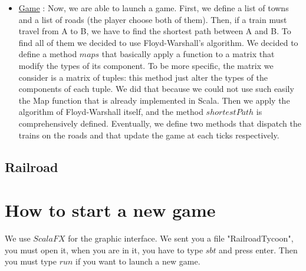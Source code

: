 \documentclass[a4paper]{article}
\begin{document}
\begin{itemize}
		\item \underline{Game} : Now, we are able to launch a game. First, we define a list of towns and a list of roads (the player choose both of them). Then, if a train must travel from A to B, we have to find the shortest path between A and B. To find all of them we decided to use Floyd-Warshall's algorithm. 
		We decided to define a method $maps$ that basically apply a function to a matrix that modify the types of its component. To be more specific, the matrix we consider is a matrix of tuples: this method just alter the types of the components of each tuple. We did that because we could not use such easily the Map function that is already implemented in Scala. 
		Then we apply the algorithm of Floyd-Warshall itself, and the method $shortestPath$ is comprehensively defined.
		Eventually, we define two methods that dispatch the trains on the roads and that update the game at each ticks respectively. 
		
		
		
		
	\end{itemize}
	\subsection{Railroad}
	
	\section{How to start a new game}
	
	We use $ScalaFX$ for the graphic interface. We sent you a file "RailroadTycoon", you must open it, when you are in it, you have to type $sbt$ and press enter. Then you must type $run$ if you want to launch a new game.
	
		
\end{document}
